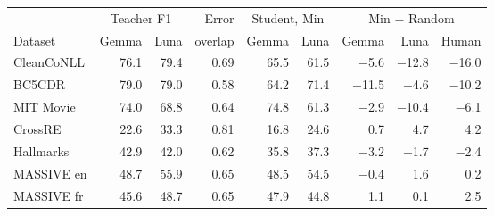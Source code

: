 \begin{tabular}{lrrrrrrrr}
\toprule
 & \multicolumn{2}{c}{Teacher F1} & Error & \multicolumn{2}{c}{Student, Min} & \multicolumn{3}{c}{Min $-$ Random} \\
\cmidrule(lr){2-3} \cmidrule(lr){5-6} \cmidrule(lr){7-9}
Dataset & Gemma & Luna & overlap & Gemma & Luna & Gemma & Luna & Human \\
\midrule
CleanCoNLL & 76.1 & 79.4 & 0.69 & 65.5 & 61.5 & $-$5.6 & $-$12.8 & $-$16.0 \\
BC5CDR & 79.0 & 79.0 & 0.58 & 64.2 & 71.4 & $-$11.5 & $-$4.6 & $-$10.2 \\
MIT Movie & 74.0 & 68.8 & 0.64 & 74.8 & 61.3 & $-$2.9 & $-$10.4 & $-$6.1 \\
CrossRE & 22.6 & 33.3 & 0.81 & 16.8 & 24.6 & 0.7 & 4.7 & 4.2 \\
Hallmarks & 42.9 & 42.0 & 0.62 & 35.8 & 37.3 & $-$3.2 & $-$1.7 & $-$2.4 \\
MASSIVE en & 48.7 & 55.9 & 0.65 & 48.5 & 54.5 & $-$0.4 & 1.6 & 0.2 \\
MASSIVE fr & 45.6 & 48.7 & 0.65 & 47.9 & 44.8 & 1.1 & 0.1 & 2.5 \\
\bottomrule
\end{tabular}
